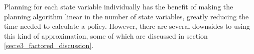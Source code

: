 Planning for each state variable individually has the benefit of making the
planning algorithm linear in the number of state variables, greatly reducing
the time needed to calculate a policy. However, there are several downsides to
using this kind of approximation, some of which are discussed in section
\ref{sec:e3_factored_discussion}. 
